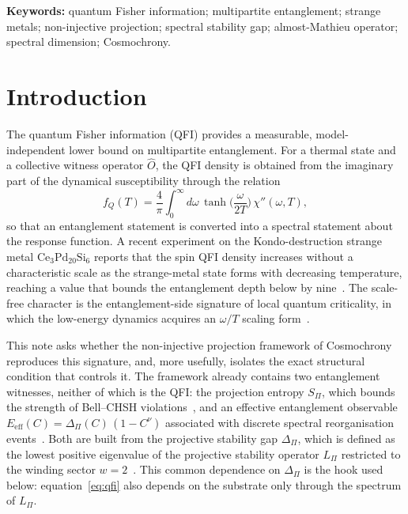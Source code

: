 \documentclass[11pt]{article}
\newcommand{\DPi}{\Delta_\Pi}
\newcommand{\fQ}{f_Q}
\newcommand{\Lap}{L_\Pi}
\begin{document}
\noindent\textbf{Keywords:} quantum Fisher information; multipartite entanglement; strange metals; non-injective
projection; spectral stability gap; almost-Mathieu operator; spectral dimension; Cosmochrony.

\newpage
\tableofcontents

\newpage
\section{Introduction}
\label{sec:intro}

The quantum Fisher information (QFI) provides a measurable, model-independent lower bound on multipartite
entanglement.
For a thermal state and a collective witness operator $\hat O$, the QFI density is obtained from the imaginary
part of the dynamical susceptibility through the relation~\cite{Hauke2016}
\begin{equation}
\fQ(T) = \frac{4}{\pi}\int_0^\infty d\omega \, \tanh\!\Big(\frac{\omega}{2T}\Big)\,\chi''(\omega,T),
\label{eq:qfi}
\end{equation}
so that an entanglement statement is converted into a spectral statement about the response function.
A recent experiment on the Kondo-destruction strange metal $\mathrm{Ce}_3\mathrm{Pd}_{20}\mathrm{Si}_6$ reports
that the spin QFI density increases without a characteristic scale as the strange-metal state forms with
decreasing temperature, reaching a value that bounds the entanglement depth below by nine~\cite{Mazza2026}.
The scale-free character is the entanglement-side signature of local quantum criticality, in which the
low-energy dynamics acquires an $\omega/T$ scaling form~\cite{Si2001}.

This note asks whether the non-injective projection framework of Cosmochrony~\cite{Cosmochrony} reproduces this
signature, and, more usefully, isolates the exact structural condition that controls it.
The framework already contains two entanglement witnesses, neither of which is the QFI: the projection entropy
$S_\Pi$, which bounds the strength of Bell--CHSH violations~\cite{Beau2026b}, and an effective entanglement
observable $E_{\mathrm{eff}}(C)=\DPi(C)\,(1-C^\nu)$ associated with discrete spectral reorganisation
events~\cite{Cosmochrony}.
Both are built from the projective stability gap $\DPi$, which is defined as the lowest positive eigenvalue of the
projective stability operator $\Lap$ restricted to the winding sector $w=2$~\cite{Cosmochrony, Beau2026g}.
This common dependence on $\DPi$ is the hook used below: equation~\eqref{eq:qfi} also depends on the substrate only
through the spectrum of $\Lap$.
\end{document}
